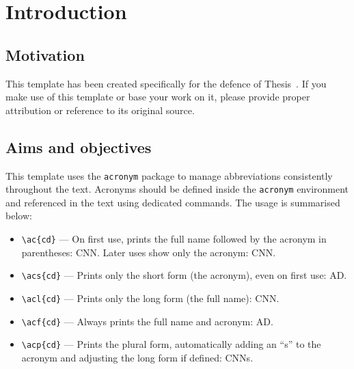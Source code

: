
\chapter{Introduction}\label{chap_01}
\minitoc

\section{Motivation}\label{sec_motivation}

This template has been created specifically for the defence of Thesis~\cite{tesis}. If you make use of this template or base your work on it, please provide proper attribution or reference to its original source.



\section{Aims and objectives}\label{sec_aims}

This template uses the \texttt{acronym} package to manage abbreviations consistently throughout the text. Acronyms should be defined inside the \texttt{acronym} environment and referenced in the text using dedicated commands. The usage is summarised below:

\begin{itemize}
    \item \verb|\ac{cd}| — On first use, prints the full name followed by the acronym in parentheses: \ac{CNN}. Later uses show only the acronym: \ac{CNN}.
    
    \item \verb|\acs{cd}| — Prints only the short form (the acronym), even on first use: \acs{AD}.
    
    \item \verb|\acl{cd}| — Prints only the long form (the full name): \acl{CNN}.
    
    \item \verb|\acf{cd}| — Always prints the full name and acronym: \acf{AD}.
    
    \item \verb|\acp{cd}| — Prints the plural form, automatically adding an “s” to the acronym and adjusting the long form if defined: \acp{CNN}.
\end{itemize}

